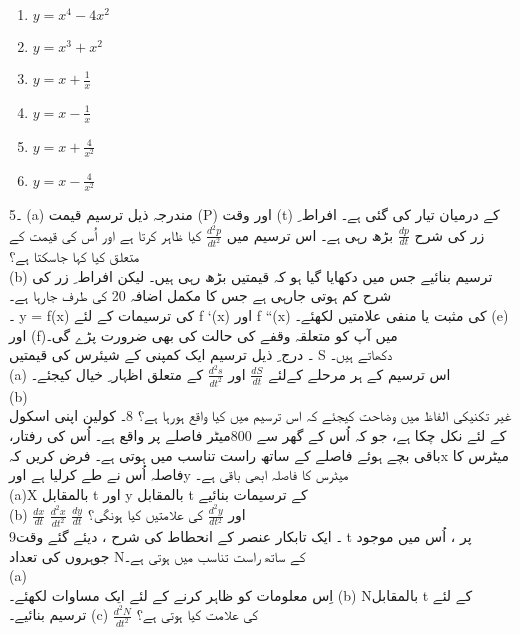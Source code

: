  \begin{multicols}{3}
  \begin{enumerate}[.a]
  \item \( y=x^4-4x^2 \) 
  \item \( y=x^3+x^2 \)
  \item \( y=x+\frac{1}{x} \)
  \item \( y=x-\frac{1}{x} \) 
  \item \( y=x+\frac{4}{x^2} \)
  \item \( y=x-\frac{4}{x^2} \) 
  \end{enumerate}
  \end{multicols}
5۔  (a)  مندرجہ ذیل ترسیم قیمت (P) اور وقت (t) کے درمیان تیار کی گئی ہے۔ افراط  ِ زر کی شرح   
\(\frac{dp}{dt}\)
بڑھ رہی ہے۔ اس ترسیم میں  
\(\frac{d^{2}p}{dt^{2}}\)
 کیا ظاہر کرتا ہے اور اُس کی قیمت کے متعلق کیا کہا جاسکتا ہے؟\\
(b) ترسیم بنائیے جس میں دکھایا گیا ہو کہ قیمتیں بڑھ رہی ہیں۔  لیکن افراط  ِ زر کی شرح کم ہوتی جارہی ہے جس کا مکمل اضافہ 20   کی طرف جارہا ہے۔\\ 
۔  y = f(x) کی ترسیمات کے لئے f `(x) اور f ``(x)  کی مثبت یا منفی علامتیں لکھئے۔ (e)  اور   (f)میں آپ کو متعلقہ وقفے کی حالت کی بھی ضرورت پڑے گی۔ \\
۔ درج  ِ ذیل ترسیم ایک کمپنی کے شیئرس کی قیمتیں S دکھاتے ہیں۔\\
(a) اس ترسیم کے ہر مرحلے کےلئے 
\(\frac{dS}{dt}\)
اور
\(\frac{d^{2}s}{dt^{2}}\)
 کے متعلق اظہار ِ خیال کیجئے۔ \\
(b) \\غیر تکنیکی الفاظ میں وضاحت کیجئے کہ اس ترسیم میں کیا واقع ہورہا  ہے؟
8۔ کولین اپنی اسکول کے لئے نکل چکا ہے،  جو کہ اُس کے گھر سے 800میٹر فاصلے پر واقع ہے۔  اُس کی رفتار،  باقی بچے ہوئے فاصلے کے ساتھ راست تناسب میں ہوتی ہے۔ فرض کریں کہx  میٹرس کا فاصلہ اُس نے طے کرلیا ہے اورy  میٹرس کا فاصلہ ابھی باقی ہے۔ \\
	(a)X
	  بالمقابل t
	اور
	y
	بالمقابل 
	t
	کے ترسیمات بنائیے\\
	(b)
	  \(\frac{dx}{dt}\)
	  \(\frac{d^{2}x}{dt^{2}}\)
	  \(\frac{dy}{dt}\)
	 اور
    \(\frac{d^{2}y}{dt{^2}}\)
	  کی علامتیں کیا ہونگی؟\\
9۔ ایک تابکار عنصر کے انحطاط کی شرح ، دیئے گئے وقت t پر ،  اُس میں موجود جوہروں کی تعداد  Nکے ساتھ راست تناسب میں ہوتی ہے۔\\
	(a)	\\اِس معلومات کو ظاہر کرنے کے لئے ایک مساوات لکھئے۔
(b)	 Nبالمقابل  t کے لئے ترسیم بنائیے۔
	(c)	 \(\frac{d^{2}N}{dt^{2}}\)
	  کی علامت کیا ہوتی ہے؟\\
	

